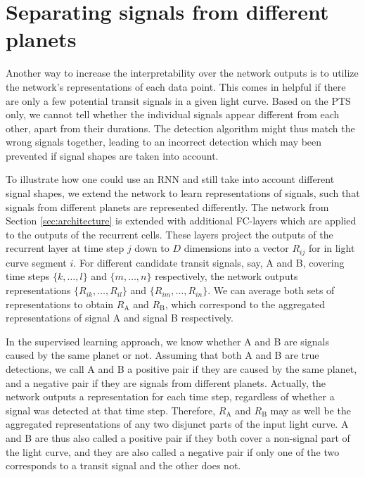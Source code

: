 
\section{Separating signals from different planets}
\label{sec:rnn_repr}


Another way to increase the interpretability over the network outputs is to utilize the network's representations of each data point. This comes in helpful if there are only a few potential transit signals in a given light curve. Based on the PTS only, we cannot tell whether the individual signals appear different from each other, apart from their durations. The detection algorithm might thus match the wrong signals together, leading to an incorrect detection which may been prevented if signal shapes are taken into account. 

To illustrate how one could use an RNN and still take into account different signal shapes, we extend the network to learn representations of signals, such that signals from different planets are represented differently. The network from Section \ref{sec:architecture} is extended with additional FC-layers which are applied to the outputs of the recurrent cells. These layers project the outputs of the recurrent layer at time step $j$ down to $D$ dimensions into a vector $R_{ij}$ for in light curve segment $i$. For different candidate transit signals, say, A and B, covering time steps $\{k,\dots,l\}$ and $\{m,\dots,n\}$ respectively, the network outputs representations $\{R_{ik},\dots,R_{il}\}$ and $\{R_{im},\dots,R_{in}\}$. We can average both sets of representations to obtain $R_\text{A}$ and $R_\text{B}$, which correspond to the aggregated representations of signal A and signal B respectively. 

In the supervised learning approach, we know whether A and B are signals caused by the same planet or not. Assuming that both A and B are true detections, we call A and B a positive pair if they are caused by the same planet, and a negative pair if they are signals from different planets. Actually, the network outputs a representation for each time step, regardless of whether a signal was detected at that time step. Therefore, $R_\text{A}$ and $R_\text{B}$ may as well be the aggregated representations of any two disjunct parts of the input light curve. A and B are thus also called a positive pair if they both cover a non-signal part of the light curve, and they are also called a negative pair if only one of the two corresponds to a transit signal and the other does not.


